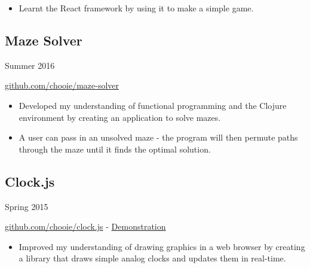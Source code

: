 \begin{itemize}
  \item Learnt the React framework by using it to make a simple game.
\end{itemize}

\noindent\begin{minipage}[b]{0.8\textwidth}
  \subsection*{Maze Solver}
\end{minipage}
\noindent\begin{minipage}[b]{0.2\textwidth}
  \flushright
  Summer 2016
\end{minipage}

\href{https://github.com/chooie/maze-solver} {github.com/chooie/maze-solver}

\begin{itemize}
\item Developed my understanding of functional programming and the Clojure
  environment by creating an application to solve mazes.

\item A user can pass in an unsolved maze - the program will then permute paths
  through the maze until it finds the optimal solution.
\end{itemize}

\noindent\begin{minipage}[b]{0.8\textwidth}
  \subsection*{Clock.js}
\end{minipage}
\noindent\begin{minipage}[b]{0.2\textwidth}
  \flushright
  Spring 2015
\end{minipage}

\href{https://github.com/chooie/clock.js} {github.com/chooie/clock.js} -
\href {https://chooie.github.io/clock.js} {Demonstration}

\begin{itemize}
\item Improved my understanding of drawing graphics in a web browser by creating
  a library that draws simple analog clocks and updates them in real-time.
\end{itemize}

